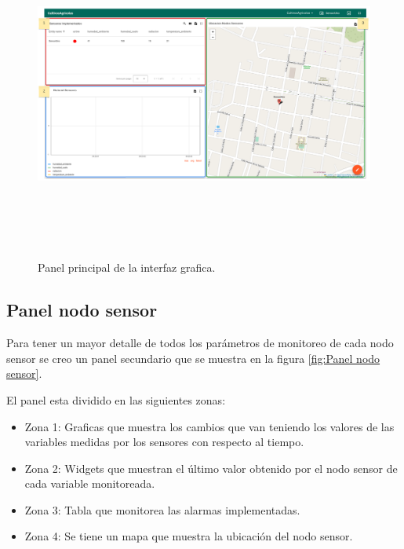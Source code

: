 \begin{figure}[h]
  \centering
	\includegraphics[width=\textwidth, height=11cm]{./Figures/panel_principal_editado.png}
  \caption{Panel principal de la interfaz grafica.}
	\label{fig:Panel principal}
\end{figure}

\clearpage
\subsection{Panel nodo sensor} 

Para tener un mayor detalle de todos los parámetros de monitoreo de cada nodo sensor se creo un panel secundario que se muestra en la figura \ref{fig:Panel nodo sensor}.

El panel esta dividido en las siguientes zonas:
\begin{itemize}
  \item Zona 1: Graficas que muestra los cambios que van teniendo los valores de las variables medidas por los sensores con respecto al tiempo.
  \item Zona 2: Widgets que muestran el último valor obtenido por el nodo sensor de cada variable monitoreada.
  \item Zona 3: Tabla que monitorea las alarmas implementadas. 
  \item Zona 4: Se tiene un mapa que muestra la ubicación del nodo sensor.
\end{itemize}

